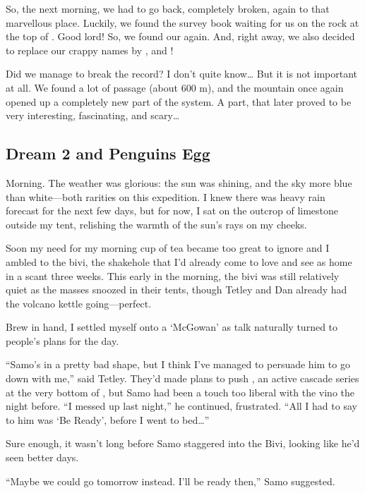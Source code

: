 So, the next morning, we had to go back, completely broken, again to
that marvellous place. Luckily, we found the survey book waiting for us
on the rock at the top of . Good lord! So, we found our
 again. And, right away, we also decided to replace our
crappy names by , and !

Did we manage to break the record? I don't quite know\ldots{} But it is
not important at all. We found a lot of passage (about 600 m), and the
mountain once again opened up a completely new part of the system. A
part, that later proved to be very interesting, fascinating, and
scary\ldots{}



\subsection{Dream 2 and Penguins Egg}

Morning. The weather was glorious: the sun was shining, and the sky more
blue than white---both rarities on this expedition. I knew there was
heavy rain forecast for the next few days, but for now, I sat on the
outcrop of limestone outside my tent, relishing the warmth of the sun's
rays on my cheeks.

Soon my need for my morning cup of tea became too great to ignore and I
ambled to the bivi, the shakehole that I'd already come to love and see
as home in a scant three weeks. This early in the morning, the bivi was
still relatively quiet as the masses snoozed in their tents, though
Tetley and Dan already had the volcano kettle going---perfect.

Brew in hand, I settled myself onto a `McGowan'
 as
talk naturally turned to people's plans for the day.

``Samo's in a pretty bad shape, but I think I've managed to persuade him
to go down with me,'' said Tetley. They'd made plans to push
, an active cascade series at the very bottom of
, but Samo had been a touch too liberal with the vino
the night before. ``I messed up last night,'' he continued, frustrated.
``All I had to say to him was `Be Ready', before I went to bed\ldots{}''

Sure enough, it wasn't long before Samo staggered into the Bivi, looking
like he'd seen better days.

``Maybe we could go tomorrow instead. I'll be ready then,'' Samo
suggested.


